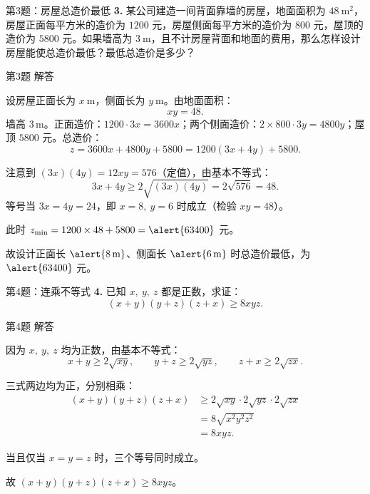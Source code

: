 \documentclass[10pt,aspectratio=169,serif]{beamer}
\begin{document}
\begin{frame}[t]{第3题：房屋总造价最低}
\textbf{3.} 某公司建造一间背面靠墙的房屋，地面面积为 $48\ \mathrm{m^2}$，房屋正面每平方米的造价为 $1200$ 元，房屋侧面每平方米的造价为 $800$ 元，屋顶的造价为 $5800$ 元。如果墙高为 $3\ \mathrm{m}$，且不计房屋背面和地面的费用，那么怎样设计房屋能使总造价最低？最低总造价是多少？
\end{frame}

\begin{frame}[t]{第3题 解答}
\begin{tcolorbox}[colback=orange!10,colframe=orange,title=\textbf{解}]
设房屋正面长为 $x\ \mathrm{m}$，侧面长为 $y\ \mathrm{m}$。由地面面积：
\[
xy=48.
\]
墙高 $3\,\mathrm{m}$。正面造价：$1200\cdot 3x=3600x$；两个侧面造价：$2\times 800\cdot 3y=4800y$；屋顶 $5800$ 元。总造价：
\[
z=3600x+4800y+5800=1200(3x+4y)+5800.
\]

注意到 $(3x)(4y)=12xy=576$（定值），由基本不等式：
\[
3x+4y\ge 2\sqrt{(3x)(4y)}=2\sqrt{576}=48.
\]
等号当 $3x=4y=24$，即 $x=8,\ y=6$ 时成立（检验 $xy=48$）。

此时 $z_{\min}=1200\times 48+5800=\alert{63400}$ 元。

\vspace{0.3em}
故设计正面长 $\alert{8\,\mathrm{m}}$、侧面长 $\alert{6\,\mathrm{m}}$ 时总造价最低，为 $\alert{63400}$ 元。
\end{tcolorbox}
\end{frame}

\begin{frame}[t]{第4题：连乘不等式}
\textbf{4.} 已知 $x,\ y,\ z$ 都是正数，求证：
\[
(x+y)(y+z)(z+x)\ge 8xyz.
\]
\end{frame}

\begin{frame}[t]{第4题 解答}
\begin{tcolorbox}[colback=orange!10,colframe=orange,title=\textbf{证明}]
因为 $x,\ y,\ z$ 均为正数，由基本不等式：
\[
x+y\ge 2\sqrt{xy},\qquad
y+z\ge 2\sqrt{yz},\qquad
z+x\ge 2\sqrt{zx}.
\]

三式两边均为正，分别相乘：
\begin{align*}
(x+y)(y+z)(z+x)
&\ge 2\sqrt{xy}\cdot 2\sqrt{yz}\cdot 2\sqrt{zx}\\
&=8\sqrt{x^2y^2z^2}\\
&=8xyz.
\end{align*}

当且仅当 $x=y=z$ 时，三个等号同时成立。

故 \alert{$(x+y)(y+z)(z+x)\ge 8xyz$}。
\end{tcolorbox}
\end{frame}
\end{document}
